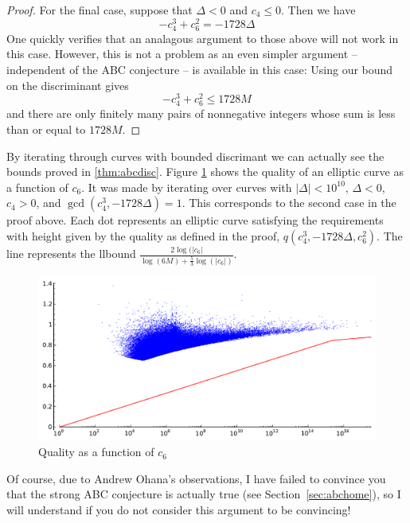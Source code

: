 \documentclass{book}
\begin{document}
\begin{proof}
For the final case, suppose that $\Delta < 0$ and $c_4 \leq 0$.
Then we have
$$
-c_4^3 + c_6^2 = - 1728 \Delta
$$
One quickly verifies that an analagous argument to those above will
not work in this case.  However, this is not a problem as an even simpler
argument -- independent of the ABC conjecture -- is available in this case:
Using our bound on the discriminant gives
$$
-c_4^3 + c_6^2 \leq 1728M
$$
and there are only finitely many pairs of nonnegative integers whose sum is
less than or equal to $1728M$.
\end{proof}

By iterating through curves with bounded discrimant we can
actually see the bounds proved in \ref{thm:abcdisc}. Figure
\ref{fig:abcdiscplot} shows the quality of an elliptic curve as
a function of $c_6$. It was made by iterating over curves with
$|\Delta| < 10^{10}$, $\Delta < 0$, $c_4>0$, and
$\gcd(c_4^3,-1728\Delta)=1$. This corresponds to the second case
in the proof above. Each dot represents an elliptic curve
satisfying the requirements with height given by the quality as
defined in the proof, $q(c_4^3,-1728\Delta,c_6^2)$. The line
represents the llbound
$\frac{2\log(|c_6|}{\log(6M) + \frac{5}{3}\log(|c_6|)}$.

\begin{center}
\begin{figure}[h]
    \includegraphics[width=\textwidth]{pics/c6_quality_plot.pdf}
    \caption{Quality as a function of $c_6$}
    \label{fig:abcdiscplot}
\end{figure}
\end{center}



Of course, due to Andrew Ohana's observations,
I have failed to convince you
that the strong ABC conjecture is actually true (see Section~\ref{sec:abchome}),
so I will understand if you do not consider this argument
to be convincing!
\end{document}
